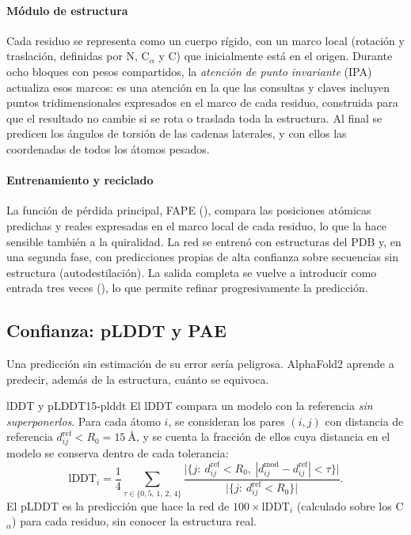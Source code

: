 \paragraph{Módulo de estructura} Cada residuo se representa como un cuerpo rígido, con un marco local (rotación y traslación, definidas por N, C$_\alpha$ y C) que inicialmente está en el origen. Durante ocho bloques con pesos compartidos, la \emph{atención de punto invariante} (IPA) actualiza esos marcos: es una atención en la que las consultas y claves incluyen puntos tridimensionales expresados en el marco de cada residuo, construida para que el resultado no cambie si se rota o traslada toda la estructura. Al final se predicen los ángulos de torsión de las cadenas laterales, y con ellos las coordenadas de todos los átomos pesados.

\paragraph{Entrenamiento y reciclado} La función de pérdida principal, FAPE (), compara las posiciones atómicas predichas y reales expresadas en el marco local de cada residuo, lo que la hace sensible también a la quiralidad. La red se entrenó con estructuras del PDB y, en una segunda fase, con predicciones propias de alta confianza sobre secuencias sin estructura (autodestilación). La salida completa se vuelve a introducir como entrada tres veces (), lo que permite refinar progresivamente la predicción.

\subsection{Confianza: pLDDT y PAE}

Una predicción sin estimación de su error sería peligrosa. AlphaFold2 aprende a predecir, además de la estructura, cuánto se equivoca.

\begin{definicion}{lDDT y pLDDT}{15-plddt}
El lDDT \parencite{c15-mariani2013} compara un modelo con la referencia \emph{sin superponerlos}. Para cada átomo $i$, se consideran los pares $(i,j)$ con distancia de referencia $d^{\mathrm{ref}}_{ij}<R_0=\SI{15}{\angstrom}$, y se cuenta la fracción de ellos cuya distancia en el modelo se conserva dentro de cada tolerancia:
\begin{equation}\label{eq:15-lddt}
\mathrm{lDDT}_i=\frac14\sum_{\tau\in\{0{,}5,\,1,\,2,\,4\}}\frac{\big|\{j:\ d^{\mathrm{ref}}_{ij}<R_0,\ |d^{\mathrm{mod}}_{ij}-d^{\mathrm{ref}}_{ij}|<\tau\}\big|}{\big|\{j:\ d^{\mathrm{ref}}_{ij}<R_0\}\big|}.
\end{equation}
El pLDDT es la predicción que hace la red de $100\times\mathrm{lDDT}_i$ (calculado sobre los C$_\alpha$) para cada residuo, sin conocer la estructura real.
\end{definicion}


